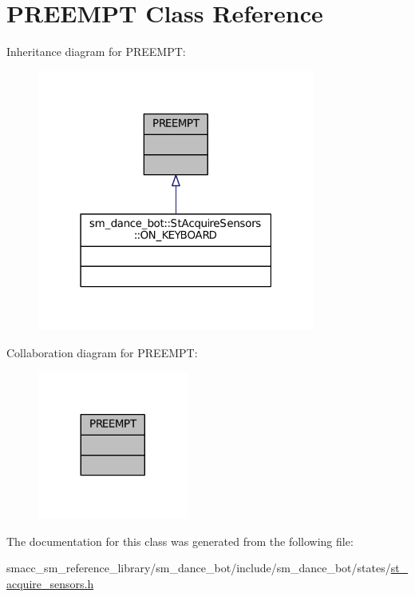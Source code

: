 \hypertarget{classPREEMPT}{}\section{P\+R\+E\+E\+M\+PT Class Reference}
\label{classPREEMPT}


Inheritance diagram for P\+R\+E\+E\+M\+PT\+:
\nopagebreak
\begin{figure}[H]
\begin{center}
\leavevmode
\includegraphics[width=259pt]{classPREEMPT__inherit__graph}
\end{center}
\end{figure}


Collaboration diagram for P\+R\+E\+E\+M\+PT\+:
\nopagebreak
\begin{figure}[H]
\begin{center}
\leavevmode
\includegraphics[width=140pt]{classPREEMPT__coll__graph}
\end{center}
\end{figure}


The documentation for this class was generated from the following file\+:\begin{DoxyCompactItemize}
\item 
smacc\+\_\+sm\+\_\+reference\+\_\+library/sm\+\_\+dance\+\_\+bot/include/sm\+\_\+dance\+\_\+bot/states/\hyperlink{st__acquire__sensors_8h}{st\+\_\+acquire\+\_\+sensors.\+h}\end{DoxyCompactItemize}
